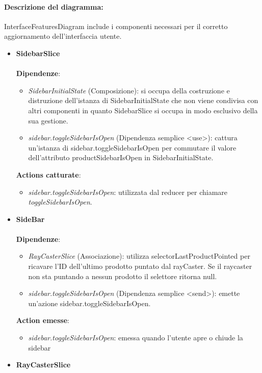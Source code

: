 \paragraph*{Descrizione del diagramma:}
InterfaceFeaturesDiagram include i componenti necessari per il corretto aggiornamento dell'interfaccia utente.
\begin{itemize}
		\item \textbf{SidebarSlice}
		\\\\
		\textbf{Dipendenze}:
		\begin{itemize}
			\item \textit{SidebarInitialState} (Composizione): si occupa della costruzione e distruzione dell'istanza di SidebarInitialState
			che non viene condivisa con altri componenti in quanto SidebarSlice si occupa in modo esclusivo della sua gestione.
			\item \textit{sidebar.toggleSidebarIsOpen} (Dipendenza semplice \textless use\textgreater): cattura un'istanza di sidebar.toggleSidebarIsOpen
			per commutare il valore dell'attributo productSidebarIsOpen in SidebarInitialState.
		\end{itemize}
		\textbf{Actions catturate}:
		\begin{itemize}
			\item \textit{sidebar.toggleSidebarIsOpen}: utilizzata dal reducer per chiamare \textit{toggleSidebarIsOpen}.
		\end{itemize}
		\item \textbf{SideBar}
		\\\\
		\textbf{Dipendenze}:
		\begin{itemize}
			\item \textit{RayCasterSlice} (Associazione): utilizza selectorLastProductPointed per ricavare l'ID dell'ultimo 
			prodotto puntato dal rayCaster. Se il raycaster non sta puntando a nessun prodotto il selettore ritorna null.
			\item \textit{sidebar.toggleSidebarIsOpen} (Dipendenza semplice \textless send\textgreater): emette un'azione
			sidebar.toggleSidebarIsOpen.
		\end{itemize}
		\textbf{Action emesse}:
		\begin{itemize}
			\item \textit{sidebar.toggleSidebarIsOpen}: emessa quando l'utente apre o chiude la sidebar
		\end{itemize}
		\item \textbf{RayCasterSlice}

\end{itemize}
